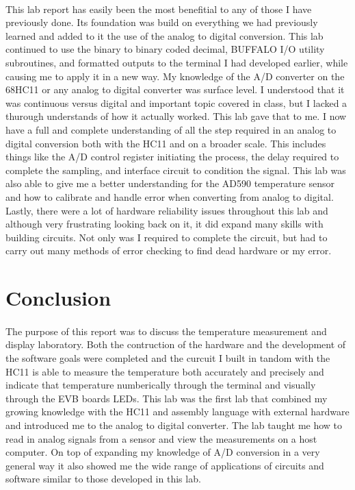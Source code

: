 \documentclass[12pt]{report}
\begin{document}
	\paragraph*{}
		This lab report has easily been the most benefitial to any of those I have previously done.  Its foundation was build on everything we had previously learned and added to it the 
		use of the analog to digital conversion.  This lab continued to use the binary to binary coded decimal, BUFFALO I/O utility subroutines, and formatted outputs to the terminal I had 
		developed earlier, while causing me to apply it in a new way.  My knowledge of the A/D converter on the 68HC11 or any analog to digital converter was surface level.  I understood 
		that it was continuous versus digital and important topic covered in class, but I lacked a thurough understands of how it actually worked.  This lab gave that to me.  I now have a full
		and complete understanding of all the step required in an analog to digital conversion both with the HC11 and on a broader scale.  This includes things like the A/D control register 
		initiating the process, the delay required to complete the sampling, and interface circuit to condition the signal.  This lab was also able to give me a better understanding for the 
		AD590 temperature sensor and how to calibrate and handle error when converting from analog to digital.  Lastly, there were a lot of hardware reliability issues throughout this lab 
		and although very frustrating looking back on it, it did expand many skills with building circuits.  Not only was I required to complete the circuit, but had to carry out many methods of
		 error checking to find dead hardware or my error.
\section*{Conclusion}
	\paragraph*{}
		The purpose of this report was to discuss the temperature measurement and display laboratory.  Both the contruction of the hardware and the development of the software goals 
		were completed and the curcuit I built in tandom with the HC11 is able to measure the temperature both accurately and precisely and indicate that temperature numberically through
		 the terminal and visually through the EVB boards LEDs.  This lab was the first lab that combined my growing knowledge with the HC11 and assembly language with external 
		 hardware and introduced me to the analog to digital converter.  The lab taught me how to read in analog signals from a sensor and view the measurements on a host computer.  
		 On top of expanding my knowledge of A/D conversion in a very general way it also showed me the wide range of applications of circuits and software similar to those developed in 
		 this lab.
\end{document}
